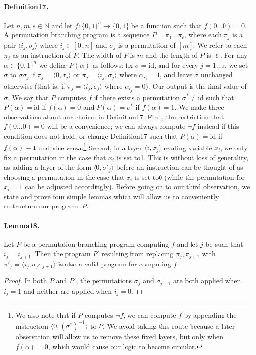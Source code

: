 \documentclass[10pt,a4paper]{article}
\begin{document}
\paragraph{Definition17.} Let $n,m,s\in\mathbb N$ and let $f:\{0,1\}^n\to\{0,1\}$ be a function such that $f(0\ldots0)=0$. A permutation branching program is a sequence $P=\pi_1\ldots\pi_{\ell}$, where each $\pi_j$ is a pair $\langle i_j,\sigma_j\rangle$ where $i_j\in[0..n]$ and $\sigma_j$ is a permutation of $[m]$. We refer to each $\pi_j$ as an instruction of $P$. The width of $P$ is $m$ and the length of $P$ is $\ell$.
For any $\alpha\in\{0,1\}^n$ we define $P(\alpha)$ as follows: fix $\sigma=\mathrm{id}$, and for every $j=1\ldots s$, we set $\sigma$ to $\sigma\sigma_j$ if $\pi_j=\langle0,\sigma_j\rangle$ or $\pi_j=\langle i_j,\sigma_j\rangle$ where $\alpha_{i_j}=1$, and leave $\sigma$ unchanged otherwise (that is, if $\pi_j=\langle i_j,\sigma_j\rangle$ where $\alpha_{i_j}=0$). Our output is the final value of $\sigma$. We say that $P$ computes $f$ if there exists a permutation $\sigma^*\neq\mathrm{id}$ such that $P(\alpha)=\mathrm{id}$ if $f(\alpha)=0$ and $P(\alpha)=\sigma^*$ if $f(\alpha)=1$.
We make three observations about our choices in Definition17. First, the restriction that $f(0\ldots0)=0$ will be a convenience; we can always compute $\neg f$ instead if this condition does not hold, or change Definition17 such that $P(\alpha)=\mathrm{id}$ if $f(\alpha)=1$ and vice versa.\footnote{We also note that if $P$ computes $\neg f$, we can compute $f$ by appending the instruction $\langle0,(\sigma^*)^{-1}\rangle$ to $P$. We avoid taking this route because a later observation will allow us to remove these fixed layers, but only when $f(\alpha)=0$, which would cause our logic to become circular.} Second, in a layer $\langle i,\sigma_j\rangle$ reading variable $x_i$, we only fix a permutation in the case that $x_i$ is set to1. This is without loss of generality, as adding a layer of the form $\langle0,\sigma'_j\rangle$ before an instruction can be thought of as choosing a permutation in the case that $x_i$ is set to0 (while the permutation for $x_i=1$ can be adjusted accordingly).
Before going on to our third observation, we state and prove four simple lemmas which will allow us to conveniently restructure our programs $P$.
\paragraph{Lemma18.} Let $P$ be a permutation branching program computing $f$ and let $j$ be such that $i_j=i_{j+1}$. Then the program $P'$ resulting from replacing $\pi_j,\pi_{j+1}$ with $\pi'_j=\langle i_j,\sigma_j\sigma_{j+1}\rangle$ is also a valid program for computing $f$.
\begin{proof}
In both $P$ and $P'$, the permutations $\sigma_j$ and $\sigma_{j+1}$ are both applied when $i_j=1$ and neither are applied when $i_j=0$.
\end{proof}
\end{document}
